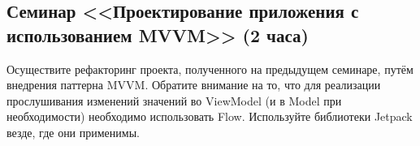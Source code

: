 \subsection{Семинар <<Проектирование приложения с использованием MVVM>> (2 часа)}

Осуществите рефакторинг проекта, полученного на предыдущем семинаре, путём внедрения паттерна MVVM. Обратите внимание на то, что 
для реализации прослушивания изменений значений во ViewModel (и в Model при необходимости) необходимо использовать Flow. Используйте библиотеки Jetpack везде, где они применимы.

